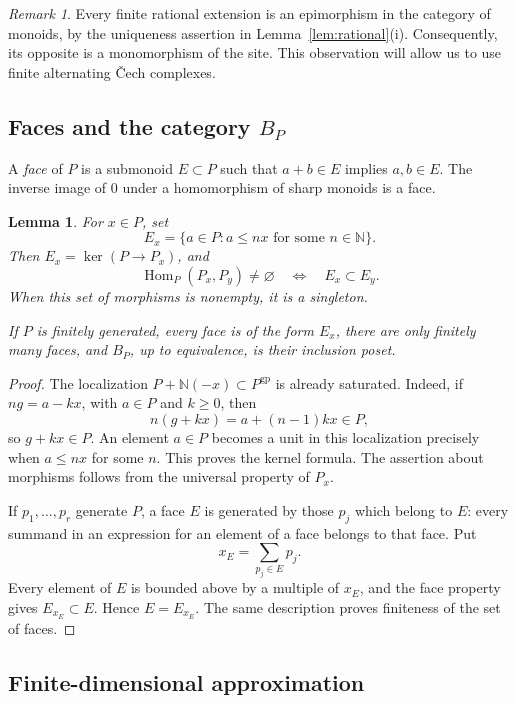 \documentclass[11pt]{article}
\newtheorem{lemma}[theorem]{Lemma}
\theoremstyle{definition}
\theoremstyle{remark}
\newtheorem{remark}[theorem]{Remark}
\DeclareMathOperator{\Hom}{Hom}
\newcommand{\gp}{\mathrm{gp}}
\newcommand{\NN}{\mathbb N}
\begin{document}
\begin{remark}\label{rem:monomorphisms}
Every finite rational extension is an epimorphism in the category
of monoids, by the uniqueness assertion in
Lemma~\ref{lem:rational}(i). Consequently, its opposite is a
monomorphism of the site. This observation will allow us to use
finite alternating \v{C}ech complexes.
\end{remark}

\subsection{Faces and the category \(B_P\)}

A \emph{face} of \(P\) is a submonoid \(E\subset P\) such that
\(a+b\in E\) implies \(a,b\in E\). The inverse image of \(0\) under a
homomorphism of sharp monoids is a face.

\begin{lemma}\label{lem:faces}
For \(x\in P\), set
\[
E_x=\{a\in P:a\le nx\text{ for some }n\in\NN\}.
\]
Then \(E_x=\ker(P\to P_x)\), and
\[
\Hom_P(P_x,P_y)\ne\varnothing
\quad\Longleftrightarrow\quad E_x\subset E_y.
\]
When this set of morphisms is nonempty, it is a singleton.

If \(P\) is finitely generated, every face is of the form \(E_x\),
there are only finitely many faces, and \(B_P\), up to equivalence,
is their inclusion poset.
\end{lemma}

\begin{proof}
The localization \(P+\NN(-x)\subset P^{\gp}\) is already saturated.
Indeed, if \(ng=a-kx\), with \(a\in P\) and \(k\ge0\), then
\[
n(g+kx)=a+(n-1)kx\in P,
\]
so \(g+kx\in P\). An element \(a\in P\) becomes a unit in this
localization precisely when \(a\le nx\) for some \(n\).
This proves the kernel formula. The assertion about morphisms
follows from the universal property of \(P_x\).

If \(p_1,\ldots,p_r\) generate \(P\), a face \(E\) is generated by
those \(p_j\) which belong to \(E\): every summand in an expression
for an element of a face belongs to that face. Put
\[
x_E=\sum_{p_j\in E}p_j.
\]
Every element of \(E\) is bounded above by a multiple of \(x_E\),
and the face property gives \(E_{x_E}\subset E\). Hence
\(E=E_{x_E}\). The same description proves finiteness of the set of
faces.
\end{proof}

\subsection{Finite-dimensional approximation}
\end{document}
